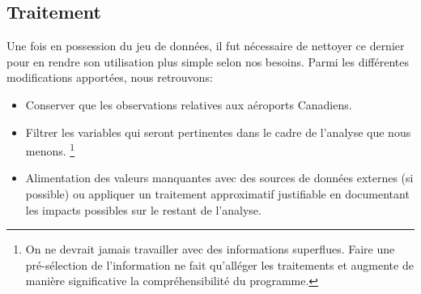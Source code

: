 \subsection{Traitement}
\label{subsec:Traitement}

Une fois en possession du jeu de données, il fut nécessaire de nettoyer ce dernier pour en rendre son utilisation plus simple selon nos besoins. Parmi les différentes modifications apportées, nous retrouvons: \\
\begin{itemize}
	\item Conserver que les observations relatives aux aéroports Canadiens.
	\item Filtrer les variables qui seront pertinentes dans le cadre de l'analyse que nous menons. 
		\footnote{On ne devrait jamais travailler avec des informations superflues. Faire une pré-sélection de l'information ne fait qu'alléger les traitements et augmente de manière significative la compréhensibilité du programme.}
	\item Alimentation des valeurs manquantes avec des sources de données externes (si possible) ou appliquer un traitement approximatif justifiable en documentant les impacts possibles sur le restant de l'analyse.
\end{itemize}
\vspace{\baselineskip}

